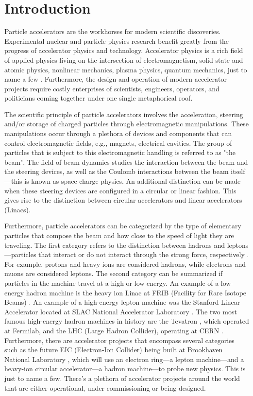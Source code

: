 \chapter{Introduction}
\label{sec:ch1}
 
Particle accelerators are the workhorses for modern scientific discoveries. Experimental nuclear and particle physics research benefit greatly from the progress of accelerator physics and technology. Accelerator physics is a rich field of applied physics living on the intersection of electromagnetism, solid-state and atomic physics, nonlinear mechanics, plasma physics, quantum mechanics, just to name a few \cite{sylee}. Furthermore, the design and operation of modern accelerator projects require costly enterprises of scientists, engineers, operators, and politicians coming together under one single metaphorical roof.         

The scientific principle of particle accelerators involves the acceleration, steering and/or storage of charged particles through electromagnetic manipulations. These manipulations occur through a plethora of devices and components that can control electromagnetic fields, e.g., magnets, electrical cavities. The group of particles that is subject to this electromagnetic handling is referred to as "the beam". The field of beam dynamics studies the interaction between the beam and the steering devices, as well as the Coulomb interactions between the beam itself---this is known as space charge physics. An additional distinction can be made when these steering devices are configured in a circular or linear fashion. This gives rise to the distinction between circular accelerators and linear accelerators (Linacs).

Furthermore, particle accelerators can be categorized by the type of elementary particles that compose the beam and how close to the speed of light they are traveling. The first category refers to the distinction between hadrons and leptons---particles that interact or do not interact through the strong force, respectively \cite{griffiths}. For example, protons and heavy ions are considered hadrons, while electrons and muons are considered leptons. The second category can be summarized if particles in the machine travel at a high or low energy. An example of a low-energy hadron machine is the heavy ion Linac at FRIB (Facility for Rare Isotope Beams) \cite{frib}. An example of a high-energy lepton machine was the Stanford Linear Accelerator located at SLAC National Accelerator Laboratory \cite{slac}. The two most famous high-energy hadron machines in history are the Tevatron \cite{tevatron}, which operated at Fermilab, and the LHC (Large Hadron Collider), operating at CERN \cite{lhc}. Furthermore, there are accelerator projects that encompass several categories such as the future EIC (Electron-Ion Collider) being built at Brookhaven National Laboratory \cite{eic}, which will use an electron ring---a lepton machine---and a heavy-ion circular accelerator---a hadron machine---to probe new physics. This is just to name a few. There's a plethora of accelerator projects around the world that are either operational, under commissioning or being designed. 

